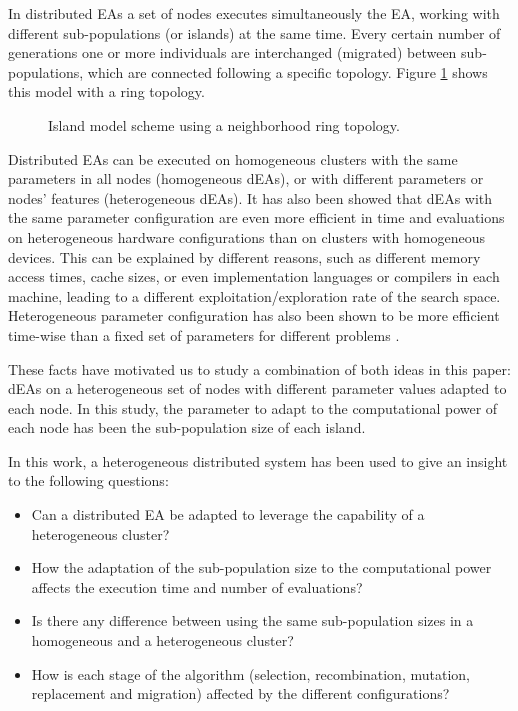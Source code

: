 \documentclass[final,1p,times]{elsarticle}
\begin{document}
In distributed EAs a set of nodes executes simultaneously the EA, working with different sub-populations (or islands) at the same time. Every certain number of generations one or more individuals are interchanged (migrated) between sub-populations, which are connected following a specific topology. Figure \ref{fig:islands} shows this model with a ring topology.  




\begin{figure}[htb]
\centering
{}
\caption{Island model scheme using a neighborhood ring topology.}
\label{fig:islands}
\end{figure}







Distributed EAs can be executed on homogeneous clusters with the same parameters in all nodes (homogeneous dEAs), or with different parameters or nodes' features (heterogeneous dEAs).
It  has also been showed \cite{HETEROGENEOUSHARD} that dEAs with the same parameter configuration are even
more efficient in time and evaluations on heterogeneous hardware configurations than on clusters with
homogeneous devices. This can be explained by different reasons, such
as different memory access times, cache sizes, 
or even implementation
languages or compilers in each machine, leading to a different
exploitation/exploration rate of the search space. 
Heterogeneous parameter
configuration  has also been shown to be more  efficient time-wise than a fixed
set 
of parameters for different problems
\cite{HETEROGENEOUSPARAMETERS}.   


These facts have motivated us to study a combination of both ideas in this paper: dEAs on a heterogeneous set of nodes with different parameter values adapted to each node. In this study, the parameter to adapt to the computational power of each node has been the sub-population size of each island.


In this work, a heterogeneous distributed system has been used to give an insight to the following questions:
\begin{itemize}
 \item Can a distributed EA be adapted to leverage the capability of a
   heterogeneous cluster? 
 \item How the adaptation of the sub-population size to the computational power affects the execution time and number of evaluations?
 \item Is there any difference between using the same sub-population sizes in a homogeneous and a heterogeneous cluster?
 \item How is each stage of the algorithm (selection, recombination, mutation, replacement and migration) affected by the different
   configurations?
\end{itemize}
\end{document}
